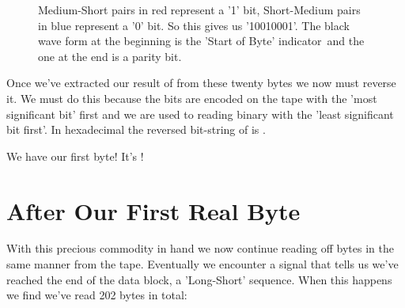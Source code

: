\begin{figure}[H]
{
	\begin{adjustbox}{width=14cm,center}
    \end{adjustbox}
}\caption[]{Medium-Short pairs in red represent a '1' bit, Short-Medium pairs in blue represent a '0' bit. So this gives
us '10010001'. The black wave form at the beginning is the 'Start of Byte' indicator\, and the one at the end is a parity bit.}
\end{figure}
Once we've extracted our result of  from these twenty bytes we now must reverse it. We must do this because
the bits are encoded on the tape with the 'most significant bit' first and we are used to reading binary with the 'least significant bit
first'. In hexadecimal the reversed bit-string of  is .

We have our first byte! It's ! 

\section{After Our First Real Byte}
With this precious commodity in hand we now continue reading off bytes in the same manner from the tape. Eventually we encounter
a signal that tells us we've reached the end of the data block, a 'Long-Short' sequence. When this happens we find we've
read 202 bytes in total:

